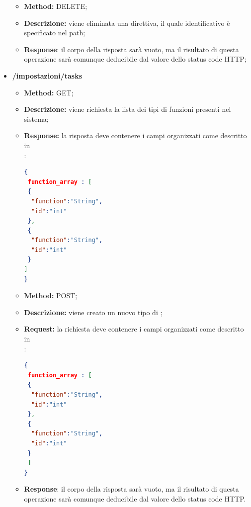 \begin{itemize}
\begin{itemize}
\end{itemize}

\begin{itemize}
\item \textbf{Method:} DELETE;
\item \textbf{Descrizione:} viene eliminata una direttiva, il quale identificativo è specificato nel path;
\item \textbf{Response}: il corpo della risposta sarà vuoto, ma il risultato di questa operazione sarà comunque deducibile dal valore dello status code HTTP;
\end{itemize}


\item \textbf{/impostazioni/tasks}\\

\begin{itemize}
\item \textbf{Method:} GET;
\item \textbf{Descrizione:} viene richiesta la lista dei tipi di funzioni presenti nel sistema;
\item \textbf{Response:} la risposta deve contenere i campi organizzati come descritto in \\:
\begin{lstlisting}[language=json,firstnumber=1]
{
 function_array : [
 {
  "function":"String",
  "id":"int"
 },
 {
  "function":"String",
  "id":"int"
 }
]
}
\end{lstlisting}
\end{itemize}

\begin{itemize}
\item \textbf{Method:} POST;
\item \textbf{Descrizione:} viene creato un nuovo tipo di ;
\item \textbf{Request:} la richiesta deve contenere i campi organizzati come descritto in \\:
\begin{lstlisting}[language=json,firstnumber=1]
{
 function_array : [
 {
  "function":"String",
  "id":"int"
 },
 {
  "function":"String",
  "id":"int"
 }
 ]
}
\end{lstlisting}
\item \textbf{Response}: il corpo della risposta sarà vuoto, ma il risultato di questa operazione sarà comunque deducibile dal valore dello status code HTTP.
\end{itemize}




\end{itemize}
